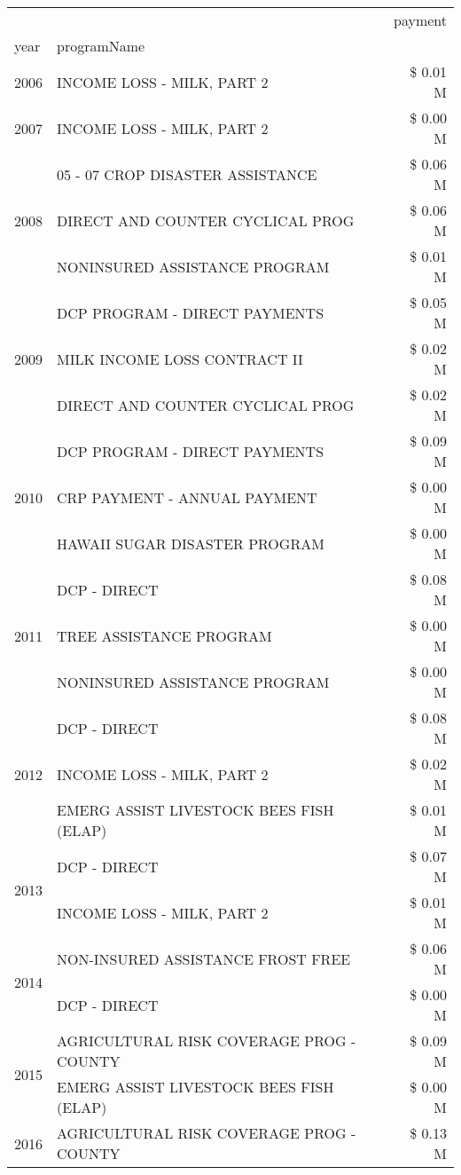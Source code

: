 \begin{tabular}{llr}
\toprule
 &  & payment \\
year & programName &  \\
\midrule
2006 & INCOME LOSS - MILK, PART 2 & \$ 0.01 M \\
\cline{1-3}
2007 & INCOME LOSS - MILK, PART 2 & \$ 0.00 M \\
\cline{1-3}
\multirow[t]{3}{*}{2008} & 05 - 07 CROP DISASTER ASSISTANCE & \$ 0.06 M \\
 & DIRECT AND COUNTER CYCLICAL PROG & \$ 0.06 M \\
 & NONINSURED ASSISTANCE PROGRAM & \$ 0.01 M \\
\cline{1-3}
\multirow[t]{3}{*}{2009} & DCP PROGRAM - DIRECT PAYMENTS & \$ 0.05 M \\
 & MILK INCOME LOSS CONTRACT II & \$ 0.02 M \\
 & DIRECT AND COUNTER CYCLICAL PROG & \$ 0.02 M \\
\cline{1-3}
\multirow[t]{3}{*}{2010} & DCP PROGRAM - DIRECT PAYMENTS & \$ 0.09 M \\
 & CRP PAYMENT - ANNUAL PAYMENT & \$ 0.00 M \\
 & HAWAII SUGAR DISASTER PROGRAM & \$ 0.00 M \\
\cline{1-3}
\multirow[t]{3}{*}{2011} & DCP - DIRECT & \$ 0.08 M \\
 & TREE ASSISTANCE PROGRAM & \$ 0.00 M \\
 & NONINSURED ASSISTANCE PROGRAM & \$ 0.00 M \\
\cline{1-3}
\multirow[t]{3}{*}{2012} & DCP - DIRECT & \$ 0.08 M \\
 & INCOME LOSS - MILK, PART 2 & \$ 0.02 M \\
 & EMERG ASSIST LIVESTOCK BEES FISH (ELAP) & \$ 0.01 M \\
\cline{1-3}
\multirow[t]{2}{*}{2013} & DCP - DIRECT & \$ 0.07 M \\
 & INCOME LOSS - MILK, PART 2 & \$ 0.01 M \\
\cline{1-3}
\multirow[t]{2}{*}{2014} & NON-INSURED ASSISTANCE FROST FREE & \$ 0.06 M \\
 & DCP - DIRECT & \$ 0.00 M \\
\cline{1-3}
\multirow[t]{2}{*}{2015} & AGRICULTURAL RISK COVERAGE PROG - COUNTY & \$ 0.09 M \\
 & EMERG ASSIST LIVESTOCK BEES FISH (ELAP) & \$ 0.00 M \\
\cline{1-3}
\multirow[t]{3}{*}{2016} & AGRICULTURAL RISK COVERAGE PROG - COUNTY & \$ 0.13 M \\

\end{tabular}

